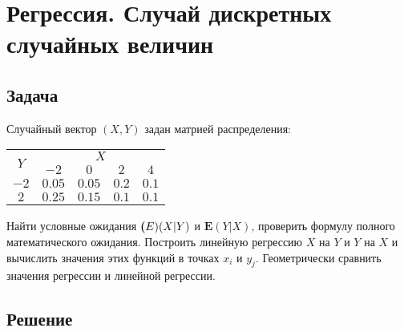 \documentclass[fleqn, 10pt]{article}
\begin{document}
\section{Регрессия. Случай дискретных случайных величин}
\subsection{Задача}
Случайный вектор \((X,Y)\) задан матрией распределения:
\begin{center}
\begin{tabular}{
    | c | c | c | c | c | }
  \hline
  \multirow{2}{1em}{\(Y\)} & \multicolumn{4}{|c|}{\(X\)} \\
  \cline{2-5}
  & \(-2\) & \(0\) & \(2\) & \(4\) \\
  \hline
  \(-2\) & \(0.05\) & \(0.05\) & \(0.2\) & \(0.1\) \\
  \hline
  \(2\) & \(0.25\) & \(0.15\) & \(0.1\) & \(0.1\) \\
  \hline
\end{tabular}
\end{center}
Найти условные ожидания \(\textbf(E)(X|Y)\) и \(\textbf{E}(Y|X)\), проверить формулу полного математического ожидания. Построить линейную регрессию \(X\) на \(Y\) и \(Y\) на \(X\) и вычислить значения этих функций в точках \(x_i\) и \(y_j\). Геометрически сравнить значения регрессии и линейной регрессии.
\subsection{Решение}
\end{document}
